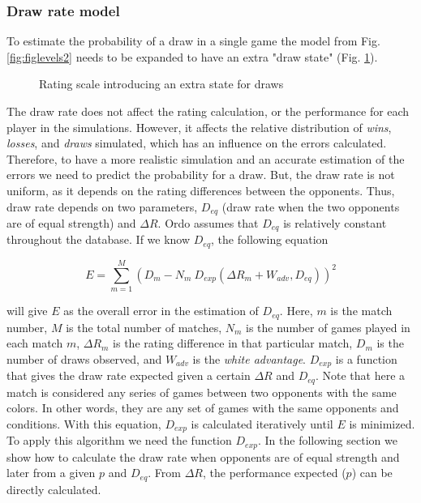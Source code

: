 \documentclass[12pt]{article}
\begin{document}

\subsubsection*{Draw rate model}

To estimate the probability of a draw in a single game the model from Fig. \ref{fig:figlevels2} needs to be expanded to have an extra "draw state" (Fig. \ref{fig:threestates}).

	\begin{figure}[htb]
	\caption{\label{fig:threestates} Rating scale introducing an extra state for draws}
	\end{figure}


The draw rate does not affect the rating calculation, or the performance for each player in the simulations.
However, it affects the relative distribution of \textit{wins}, \textit{losses}, and \textit{draws} simulated, which has an influence on the errors calculated. 
Therefore, to have a more realistic simulation and an accurate estimation of the errors we need to predict the probability for a draw.
But, the draw rate is not uniform, as it depends on the rating differences between the opponents.
Thus, draw rate depends on two parameters, $D_{eq}$ (draw rate when the two opponents are of equal strength) and $\Delta R$.
Ordo assumes that $D_{eq}$ is relatively constant throughout the database.
If we know $D_{eq}$, the following equation

	\begin{equation} \label{eq:draw_rate_errors}
	E = \sum\limits_{m=1}^M (D_{m} - N_{m}\: D_{exp}(\Delta R_{m} + W_{adv}, D_{eq}))^2
	\end{equation}

will give $E$ as the overall error in the estimation of $D_{eq}$. 
Here, $m$ is the match number, $M$ is the total number of matches, $N_{m}$ is the number of games played in each match $m$, $\Delta R_{m}$ is the rating difference in that particular match, $D_{m}$ is the number of draws observed, and $W_{adv}$ is the \textit{white advantage}.
$D_{exp}$ is a function that gives the draw rate expected given a certain $\Delta R$ and $D_{eq}$. 
Note that here a match is considered any series of games between two opponents with the same colors. 
In other words, they are any set of games with the same opponents and conditions.
With this equation, $D_{exp}$ is calculated iteratively until $E$ is minimized. 
To apply this algorithm we need the function $D_{exp}$. 
In the following section we show how to calculate the draw rate when opponents are of equal strength and later from a given $p$ and $D_{eq}$.
From $\Delta R$, the performance expected ($p$) can be directly calculated.
\end{document}
